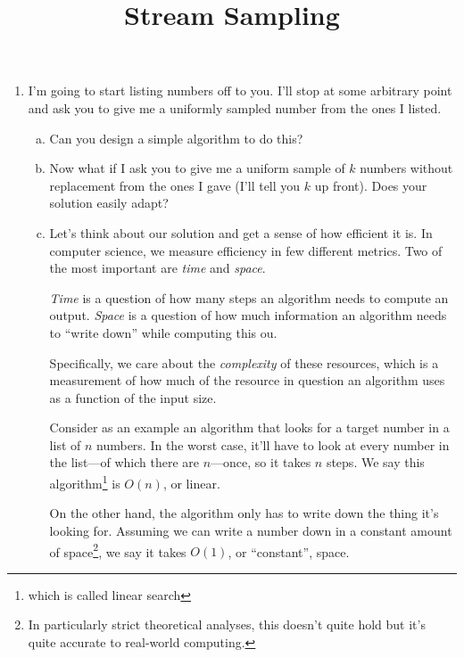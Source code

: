 \documentclass{article}
\title{Stream Sampling}
\author{}
\date{}
\begin{document}
\maketitle
\thispagestyle{fancy}

\onehalfspacing

\begin{enumerate}[1.]
\item %
  I'm going to start listing numbers off to you. I'll stop at some arbitrary
  point and ask you to give me a uniformly sampled number from the ones I
  listed.
  \begin{enumerate}[a.]
  \item %
    Can you design a simple algorithm to do this?
  \item %
    Now what if I ask you to give me a uniform sample of $k$ numbers without
    replacement from the ones I gave (I'll tell you $k$ up front). Does your
    solution easily adapt?

  \item %
    Let's think about our solution and get a sense of how efficient it is. In
    computer science, we measure efficiency in few different metrics. Two of the
    most important are \textit{time} and \textit{space}.

    \smallskip

    \textit{Time} is a question of how many steps an algorithm needs to
    compute an output. \textit{Space} is a question of how much information an
    algorithm needs to ``write down'' while computing this ou.

    \smallskip

    Specifically, we care about the \textit{complexity} of these resources, which
    is a measurement of how much of the resource in question an algorithm uses
    as a function of the input size.

    \smallskip

    Consider as an example an algorithm that looks for a target number in a list
    of $n$ numbers. In the worst case, it'll have to look at every number in the
    list---of which there are $n$---once, so it takes $n$ steps. We say this
    algorithm\footnote{which is called linear search} is $O(n)$, or linear.
    \smallskip

    On the other hand, the algorithm only has to write down the thing it's
    looking for. Assuming we can write a number down in a constant amount of
    space\footnote{In particularly strict theoretical analyses, this doesn't
      quite hold but it's quite accurate to real-world computing.}, we say it
    takes $O(1)$, or ``constant'', space.
    

\end{enumerate}
\end{enumerate}
\end{document}
